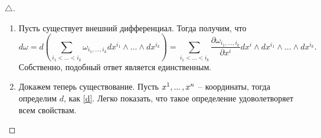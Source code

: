 \begin{proof}[$\triangle$]
    \begin{minipage}[t]{0.9\textwidth}
        \begin{enumerate}[label = \Roman*.]
            \item Пусть существует внешний дифференциал. Тогда получим, что
            \begin{equation}
            \label{d}
                    d \omega = d \left(
                    \sum_{i_1 < \ldots < i_k} \omega_{i_1, \ldots, i_k} dx^{i_1} \wedge \ldots \wedge dx^{i_k}
                    \right) =
                    \sum_{i_1 < \ldots < i_k} 
                    \frac{\partial \omega_{i_1, \ldots, i_k}}{\partial x^i} 
                    dx^i \wedge dx^{i_1} \wedge \ldots \wedge dx^{i_k}.
            \end{equation}
                Собственно, подобный ответ является единственным. 
                \item Докажем теперь существование. Пусть ${x}^{1}, ... \,, {x}^{n}$ -- координаты, тогда определим $d$, как \eqref{d}. Легко показать, что такое определение удоволетворяет всем свойствам.
        \end{enumerate}
    \end{minipage}

\phantom{42}
\end{proof}



